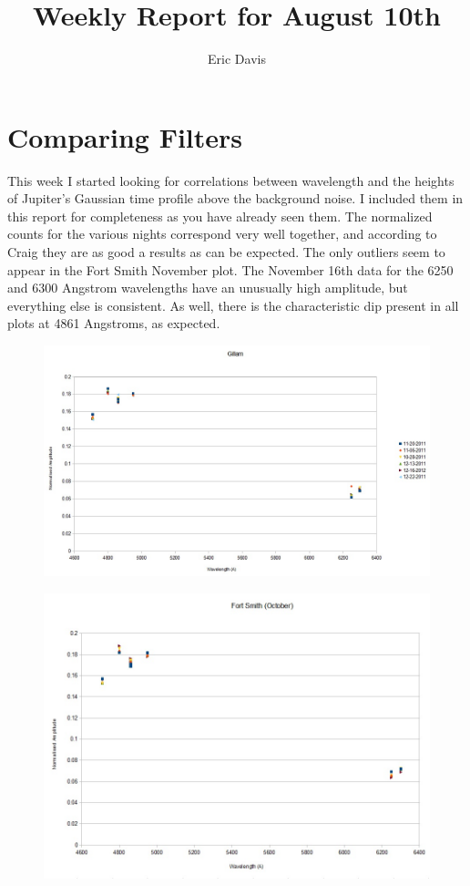 \documentclass[11pt]{article}
\title{Weekly Report for August 10th}
\author{Eric Davis}
\begin{document}
\maketitle
\medskip



\section{Comparing Filters}
\hspace{0.5cm}

This week I started looking for correlations between wavelength and the heights of Jupiter's Gaussian time profile above the background noise. I included them in this report for completeness as you have already seen them. The normalized counts for the various nights correspond very well together, and according to Craig they are as good a results as can be expected. The only outliers seem to appear in the Fort Smith November plot. The November 16th data for the 6250 and 6300 Angstrom wavelengths have an unusually high amplitude, but everything else is consistent. As well, there is the characteristic dip present in all plots at 4861 Angstroms, as expected.

\begin{figure}[h!]
\includegraphics[scale=0.6]{norm_gillam.jpg}
\end{figure}

\begin{figure}[h!]
\includegraphics[scale=0.6]{norm_fortsmith_october.jpg}
\end{figure}
\end{document}
